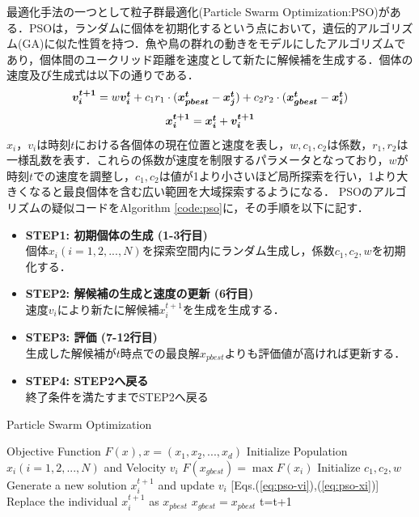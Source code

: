 \documentclass[a4j,11pt]{jarticle}
\begin{document}
最適化手法の一つとして粒子群最適化(Particle Swarm Optimization:PSO)がある．PSOは，ランダムに個体を初期化するという点において，遺伝的アルゴリズム(GA)に似た性質を持つ．魚や鳥の群れの動きをモデルにしたアルゴリズムであり，個体間のユークリッド距離を速度として新たに解候補を生成する．個体の速度及び生成式は以下の通りである．
\begin{equation}
\label{eq:pso-vi}
\mbox{\boldmath $v_i^{t+1}$}=w\mbox{\boldmath $v_i^t$}+c_1r_1 \cdot (\mbox{\boldmath $x_{pbest}^t$}-\mbox{\boldmath $x_j^t$})+c_2r_2 \cdot (\mbox{\boldmath $x_{gbest}^t$}-\mbox{\boldmath $x_i^t$})
\end{equation}
\begin{equation}
\label{eq:pso-xi}
\mbox{\boldmath $x_i^{t+1}$}=\mbox{\boldmath $x_i^t$}+\mbox{\boldmath $v_i^{t+1}$}
\end{equation}
$x_i$，$v_i$は時刻$t$における各個体の現在位置と速度を表し，$w,c_1,c_2$は係数，$r_1, r_2$は一様乱数を表す．これらの係数が速度を制限するパラメータとなっており，$w$が時刻$t$での速度を調整し，$c_1,c_2$は値が1より小さいほど局所探索を行い，1より大きくなると最良個体を含む広い範囲を大域探索するようになる．
PSOのアルゴリズムの疑似コードをAlgorithm \ref{code:pso}に，その手順を以下に記す．

\begin{itemize}
\item {\bf STEP1: 初期個体の生成 (1-3行目)}\\
個体$x_i (i=1,2,...,N)$を探索空間内にランダム生成し，係数$c_1,c_2, w$を初期化する．
\item {\bf STEP2: 解候補の生成と速度の更新 (6行目)}\\
速度$v_i$により新たに解候補$x_i^{t+1}$を生成を生成する．
\item {\bf STEP3: 評価 (7-12行目)}\\
生成した解候補が$t$時点での最良解$x_{pbest}$よりも評価値が高ければ更新する．
\item {\bf STEP4: STEP2へ戻る}\\
終了条件を満たすまでSTEP2へ戻る
\end{itemize}

\begin{algorithm}[H]
\caption{Particle Swarm Optimization}
\label{code:pso}
\begin{algorithmic}[2]
\REQUIRE Objective Function $F(x), x=(x_1,x_2,...,x_d)$
\STATE Initialize Population $x_i (i=1,2,...,N)$ and Velocity $v_i$
\STATE $F(x_{gbest})=\max{F(x_i)}$
\STATE Initialize $c_1,c_2,w$
\STATE Generate a new solution $x_i^{t+1}$ and update $v_i$ [Eqs.(\ref{eq:pso-vi}),(\ref{eq:pso-xi})]
\STATE Replace the individual $x_i^{t+1}$ as $x_{pbest}$
\ENDIF
{}
\STATE $x_{gbest}=x_{pbest}$
\ENDIF
\ENDFOR
\STATE t=t+1
\ENDWHILE
\end{algorithmic}
\end{algorithm}
\end{document}
